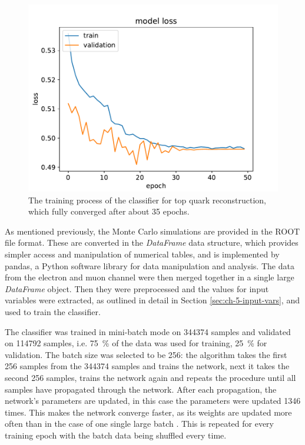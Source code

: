 \begin{figure}[h]
    \centering
    \includegraphics[scale=.75]{assets/chap04/model_loss.pdf}
    \caption{The training process of the classifier for top quark reconstruction, which fully converged after about 35 epochs.}
    \label{fig:ch_4_loss}
\end{figure}

As mentioned previously, the Monte Carlo simulations are provided in the ROOT file format. These are converted in the \emph{DataFrame} data structure, which provides simpler access and manipulation of numerical tables, and is implemented by pandas, a Python software library for data manipulation and analysis. The data from the electron and muon channel were then merged together in a single large \emph{DataFrame} object. Then they were preprocessed and the values for input variables were extracted, as outlined in detail in Section \ref{sec:ch-5-input-vars}, and used to train the classifier.

The classifier was trained in mini-batch mode on \num{344374} samples and validated on \num{114792} samples, i.e. \SI{75}{\%} of the data was used for training, \SI{25}{\%} for validation. The batch size was selected to be 256: the algorithm takes the first 256 samples from the \num{344374} samples and trains the network, next it takes the second 256 samples, trains the network again and repeats the procedure until all samples have propagated through the network. After each propagation, the network's parameters are updated, in this case the parameters were updated \num{1346} times. This makes the network converge faster, as its weights are updated more often than in the case of one single large batch \cite{153535}. This is repeated for every training epoch with the batch data being shuffled every time.

